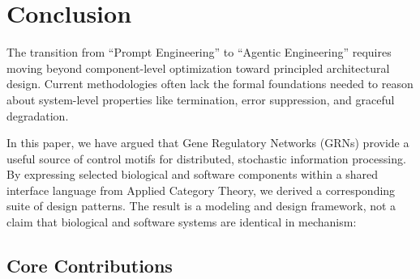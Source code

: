 \section{Conclusion}

The transition from ``Prompt Engineering'' to ``Agentic Engineering'' requires moving beyond component-level
optimization toward principled architectural design. Current methodologies often lack the formal foundations
needed to reason about system-level properties like termination, error suppression, and graceful degradation.

In this paper, we have argued that Gene Regulatory Networks (GRNs) provide a useful source of control motifs
for distributed, stochastic information processing. By expressing selected biological and software components
within a shared interface language from Applied Category Theory, we derived a corresponding suite of design
patterns. The result is a modeling and design framework, not a claim that biological and software systems are
identical in mechanism:

\subsection*{Core Contributions}

